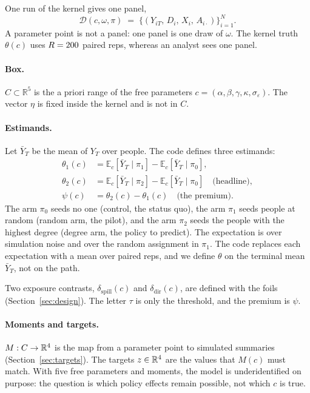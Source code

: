 \documentclass[11pt]{article}
\newcommand{\prem}{\psi}
\newcommand{\dspill}{\delta_{\mathrm{spill}}}
\newcommand{\ddir}{\delta_{\mathrm{dir}}}
\begin{document}
One run of the kernel gives one panel,
\begin{equation}
  \mathcal{D}(c,\omega,\pi)
  \;=\;
  \bigl\{(Y_{iT},\,D_i,\,X_i,\,A_{i\cdot})\bigr\}_{i=1}^{N}.
\end{equation}
A parameter point is not a panel: one panel is one draw of $\omega$. The
kernel truth $\theta(c)$ uses $R=200$ paired reps, whereas an analyst sees
one panel.

\paragraph{Box.}
$C\subset\mathbb{R}^5$ is the a priori range of the free parameters $c=(\alpha,\beta,\gamma,\kappa,\sigma_\varepsilon)$. The vector $\eta$ is
fixed inside the kernel and is not in $C$.

\paragraph{Estimands.}
Let $\bar Y_T$ be the mean of $Y_T$ over people. The code defines three
estimands:
\begin{align}
  \theta_1(c)
  &= \mathbb{E}_c[\bar Y_T\mid\pi_1]-\mathbb{E}_c[\bar Y_T\mid\pi_0],
  \\
  \theta_2(c)
  &= \mathbb{E}_c[\bar Y_T\mid\pi_2]-\mathbb{E}_c[\bar Y_T\mid\pi_0]
  \quad\text{(headline)},
  \\
  \prem(c)
  &= \theta_2(c)-\theta_1(c)
  \quad\text{(the premium)}.
\end{align}
The arm $\pi_0$ seeds no one (control, the status quo), the arm $\pi_1$ seeds \KSeeded{} people
at random (random arm, the pilot), and the arm $\pi_2$ seeds the \KSeeded{} people with
the highest degree (degree arm, the policy to predict). The expectation is over simulation
noise and over the random assignment in $\pi_1$. The code replaces each
expectation with a mean over \RepsEstimand{} paired reps, and we define
$\theta$ on the terminal mean $\bar Y_T$, not on the path.

Two exposure contrasts, $\dspill(c)$ and $\ddir(c)$, are defined with the foils
(Section~\ref{sec:design}). The letter $\tau$ is only the threshold, and
the premium is $\prem$.

\paragraph{Moments and targets.}
$M:C\to\mathbb{R}^{4}$ is the map from a parameter point to \NMoments{} simulated summaries
(Section~\ref{sec:targets}). The
targets $z\in\mathbb{R}^{4}$ are the values that $M(c)$ must match. With five free
parameters and \NMoments{} moments, the model is underidentified on purpose:
the question is which policy effects remain possible, not which $c$ is
true.
\end{document}
